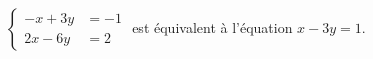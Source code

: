 $\begin{cases}-x+3y &= -1 \\ 2x-6y &= 2\end{cases}$ est équivalent à l'équation $x-3y = 1$.

\begin{reponses}
\end{reponses}


